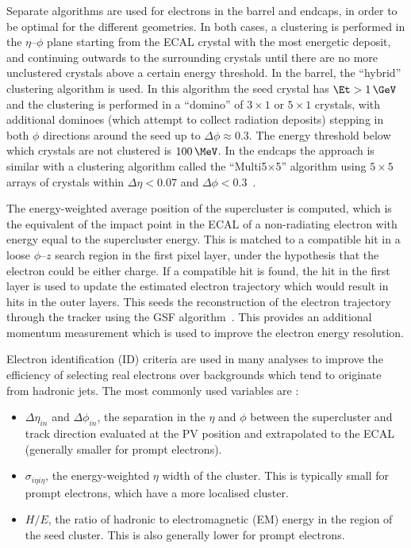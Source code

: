 Separate algorithms are used for electrons in the barrel and endcaps, in
order to be optimal for the different geometries. In both cases, a clustering is performed
in the $\eta$--$\phi$ plane starting from the \ac{ECAL} crystal with the most energetic deposit, and
continuing outwards to the surrounding crystals until there are no more
unclustered crystals above a certain energy threshold. In the barrel, the
``hybrid'' clustering algorithm is used. In this algorithm the seed crystal
has $\Et>1\,\GeV$ and the clustering is performed in a ``domino'' of $3\times1$ or
$5\times1$ crystals, with additional dominoes (which attempt to collect
radiation deposits) stepping in both $\phi$
directions around the seed up to $\Delta\phi\approx0.3$. The energy threshold
below which crystals are not clustered  is $100\,\MeV$. In the endcaps the
approach is similar with a clustering algorithm
called the ``Multi5$\times$5'' algorithm using $5\times5$ arrays of crystals within
$\Delta\eta<0.07$ and $\Delta\phi<0.3$~\cite{CMS:2013hoa}.

The energy-weighted average position of the supercluster is computed, which
is the equivalent of the impact point in the \ac{ECAL} of a
non-radiating electron with energy equal to the supercluster energy. This is
matched to a compatible hit in a loose $\phi$--$z$ search region 
in the first pixel layer, under the
hypothesis that the electron could be either charge. If a compatible hit is
found, the hit in the first layer is used to update the estimated electron
trajectory which would result in hits in the outer layers. This seeds the
reconstruction of the electron trajectory through the tracker
using the \ac{GSF} algorithm~\cite{GSFalgorithm}. This provides an additional momentum measurement
which is used to improve the electron energy resolution. 

Electron identification (ID) criteria are used in many analyses to improve the efficiency of
selecting real electrons over backgrounds which tend to originate from
hadronic jets. The most commonly used variables are \cite{Baffioni:2006cd}:

\begin{itemize}
\item $\Delta\eta_{in}$ and $\Delta\phi_{in}$, the separation in the
$\eta$ and $\phi$ between the supercluster and track direction
evaluated at the \ac{PV} position and extrapolated to the \ac{ECAL} (generally
smaller for prompt electrons).
\item $\sigma_{i\eta i\eta}$, the energy-weighted $\eta$ width of the cluster.
This is typically small for prompt electrons, which have a more localised
cluster.
\item $H/E$, the ratio of hadronic to electromagnetic (EM) energy in the region of
the seed cluster. This is also generally lower for prompt electrons.
\end{itemize}

